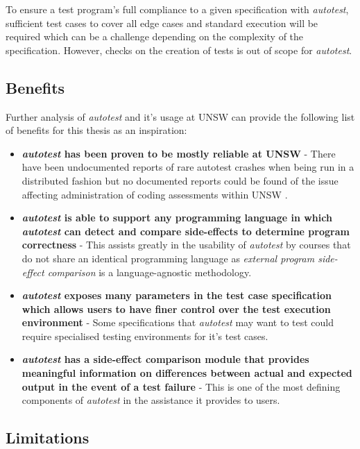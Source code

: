 \documentclass[hidelinks, 12pt]{extreport}
\begin{document}
To ensure a test program's full compliance to a given specification with \textit{autotest}, sufficient test cases to cover all edge cases and standard execution will be required which can be a challenge depending on the complexity of the specification. However, checks on the creation of tests is out of scope for \textit{autotest}.

\subsection{Benefits}

Further analysis of \textit{autotest} and it's usage at UNSW can provide the following list of benefits for this thesis as an inspiration:
\begin{itemize}
	\item \textbf{\textit{autotest} has been proven to be mostly reliable at UNSW} - There have been undocumented reports of rare autotest crashes when being run in a distributed fashion but no documented reports could be found of the issue affecting administration of coding assessments within UNSW \cite{AutotestConversation}.
	\item \textbf{\textit{autotest} is able to support any programming language in which \textit{autotest} can detect and compare side-effects to determine program correctness} - This assists greatly in the usability of \textit{autotest} by courses that do not share an identical programming language as \textit{external program side-effect comparison} is a language-agnostic methodology.
	\item \textbf{\textit{autotest} exposes many parameters in the test case specification which allows users to have finer control over the test execution environment} - Some specifications that \textit{autotest} may want to test could require specialised testing environments for it's test cases.
	\item \textbf{\textit{autotest} has a side-effect comparison module that provides meaningful information on differences between actual and expected output in the event of a test failure} - This is one of the most defining components of \textit{autotest} in the assistance it provides to users.
\end{itemize} 

\subsection{Limitations}
\end{document}
